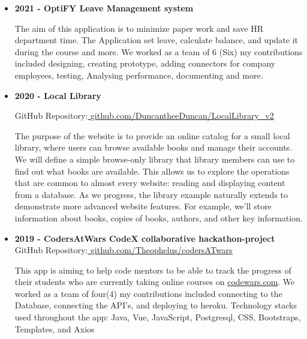 \documentclass[10pt,a4paper]{altacv}
\begin{document}
\begin{itemize}

\item\textbf{2021 - OptiFY Leave Management system}

The aim of this application is to minimize paper work and save HR department time. The Application set leave, calculate balance, and update it during the course and more. We worked as a team of 6 (Six) my contributions included designing, creating prototype, adding connectors for company employees, testing, Analysing performance, documenting and more.


\item\textbf{2020 - Local Library}

GitHub Repository:\underline{ \href{https://github.com/DuncantheeDuncan/LocalLibrary_v2}{github.com/DuncantheeDuncan/LocalLibrary\_v2}}

The purpose of the website is to provide an online catalog for a small local library, where users can browse available books and manage their accounts. We will define a simple browse-only library that library members can use to find out what books are available. This allows us to explore the operations that are common to almost every website: reading and displaying content from a database. As we progress, the library example naturally extends to demonstrate more advanced website features. For example, we'll store information about books, copies of books, authors, and other key information.

\item\textbf{2019 - CodersAtWars CodeX collaborative hackathon-project}
GitHub Repository:\underline{ \href{https://github.com/Theophelus/codersATwars}{github.com/Theophelus/codersATwars}}

This app is aiming to help code mentors to be able to track the progress of their
students who are currently taking online courses on \underline{\href{https://www.codewars.com}{codewars.com}}. We worked as a
team of four(4) my contributions included connecting to the Database, connecting the API's, and deploying to heroku. Technology stacks used throughout the app: Java, Vue, JavaScript, Postgresql, CSS, Bootstraps, Templates, and Axios


\end{itemize}
\quad










\end{document}
